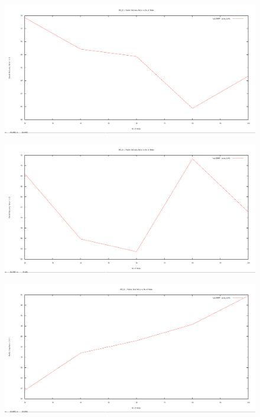 \documentclass[12pt]{article}
\begin{document}
\begin{figure}[H]
	\centering
	\includegraphics[scale=	0.26]{image/bpics/bm_packetdeliveryratio_vs_nodes.png}
\end{figure}

\begin{figure}[H]
	\centering
	\includegraphics[scale=	0.26]{image/apics/am_packetdeliveryratio_vs_nodes.png}
\end{figure}


\begin{figure}[H]
	\centering
	\includegraphics[scale=	0.26]{image/bpics/bm_packetdropratio_vs_nodes.png}
\end{figure}
\end{document}
